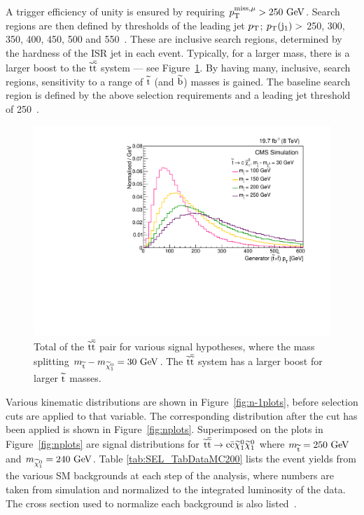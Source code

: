 A trigger efficiency of unity is ensured by requiring $p^{\rm miss, \mu}_{\rm T}>250~\mathrm{GeV}$. Search regions are then defined by thresholds of the leading jet $p_{\text{T}}$; $p_{\text{T}}({\rm j}_{1}) >$ 250, 300, 350, 400, 450, 500 and 550~\GeV.
These are inclusive search regions, determined by the hardness of the \ac{ISR} jet in each event.
Typically, for a larger \sTop{} mass, there is a larger boost to the $\widetilde{{\rm t}}\overline{\widetilde{\mathrm{t}}}${} system --- see Figure~\ref{stopstoppT}. 
By having many, inclusive, search regions, sensitivity to a range of $\widetilde{{\rm t}}${} (and $\widetilde{{\rm b}}${}) masses is gained.  
The baseline search region is defined by the above selection requirements and a leading jet threshold of 250~\GeV.

\begin{figure}%
  \begin{center}
  \includegraphics[scale=0.45]{Figures/sus13009/stopstoppt.pdf}
  \caption{Total \pt{} of the $\widetilde{{\rm t}}\overline{\widetilde{\mathrm{t}}}${} pair for various signal hypotheses, where the mass splitting $m_{\widetilde{{\rm t}}}-m_{\widetilde{\chi}^{0}_{1}} = 30~\mathrm{GeV}$. The $\widetilde{{\rm t}}\overline{\widetilde{\mathrm{t}}}${} system has a larger boost for larger $\widetilde{{\rm t}}${} masses.
         \label{stopstoppT}}
  \end{center}
\end{figure}


Various kinematic distributions are shown in Figure~\ref{fig:n-1plots}, before selection cuts are applied to that variable.
The corresponding distribution after the cut has been applied is shown in Figure~\ref{fig:nplots}.
Superimposed on the plots in Figure~\ref{fig:nplots} are signal distributions for $\widetilde{{\rm t}} \overline{\widetilde{\mathrm{t}}} \rightarrow \rm c \bar{\rm c} \widetilde{\chi}^{0}_{1} \widetilde{\chi}^{0}_{1}$ where $m_{\widetilde{{\rm t}}} = 250~\mathrm{GeV}$ and $m_{\widetilde{\chi}^{0}_{1}} = 240~\mathrm{GeV}$.
Table \ref{tab:SEL_TabDataMC200} lists the event yields from the various \ac{SM} backgrounds at each step of the analysis, where numbers are taken from simulation and normalized to the integrated luminosity of the data. The cross section used to normalize each background is also listed~\cite{Kidonakis:2010dk,Melnikov:2006kv,Kidonakis:2011wy,xsec_WZ,Kidonakis:2010tc,Kidonakis:2010ux}. 


